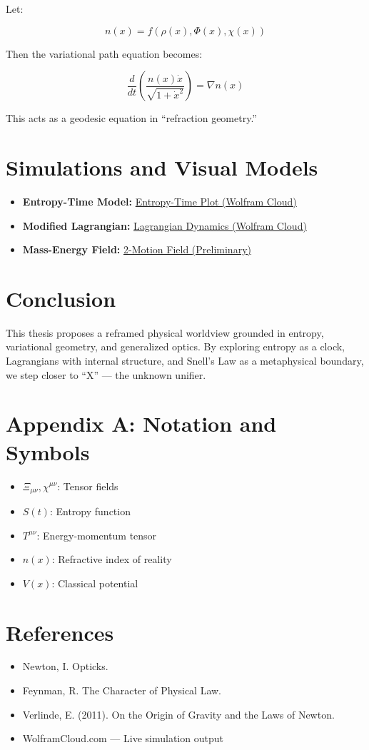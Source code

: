 \documentclass[12pt]{article}
\begin{document}
Let:

\[
n(x) = f(\rho(x), \Phi(x), \chi(x))
\]

Then the variational path equation becomes:

\[
\frac{d}{dt} \left( \frac{n(x)\dot{x}}{\sqrt{1+\dot{x}^2}} \right) = \nabla n(x)
\]

This acts as a geodesic equation in “refraction geometry.”

\section{Simulations and Visual Models}

\begin{itemize}
\item \textbf{Entropy-Time Model:}
\href{https://www.wolframcloud.com/obj/a930d0a5-5363-451a-98bf-c57df8cd1258}{Entropy-Time Plot (Wolfram Cloud)}

\item \textbf{Modified Lagrangian:}
\href{https://www.wolframcloud.com/obj/7d3daeff-075a-4d21-a181-63349d9b2cee}{Lagrangian Dynamics (Wolfram Cloud)}

\item \textbf{Mass-Energy Field:}
\href{https://www.wolframcloud.com/obj/cb2a2fc7-cbdf-4031-a0bf-483cbdb8f509}{2-Motion Field (Preliminary)}
\end{itemize}

\section{Conclusion}

This thesis proposes a reframed physical worldview grounded in entropy, variational geometry, and generalized optics. By exploring entropy as a clock, Lagrangians with internal structure, and Snell’s Law as a metaphysical boundary, we step closer to “X” — the unknown unifier.

\section*{Appendix A: Notation and Symbols}
\begin{itemize}
\item \( \Xi_{\mu\nu}, \chi^{\mu\nu} \): Tensor fields
\item \( S(t) \): Entropy function
\item \( T^{\mu\nu} \): Energy-momentum tensor
\item \( n(x) \): Refractive index of reality
\item \( V(x) \): Classical potential
\end{itemize}

\section*{References}
\begin{itemize}
\item Newton, I. Opticks.
\item Feynman, R. The Character of Physical Law.
\item Verlinde, E. (2011). On the Origin of Gravity and the Laws of Newton.
\item WolframCloud.com — Live simulation output
\end{itemize}
\end{document}

